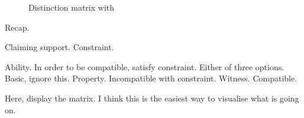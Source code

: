 \begin{note}
  \begin{figure}[H]
    \centering
    \saMtxInterpreted{}
    \caption{Distinction matrix with }
    \label{fig:saMtxInterpreted:outline}
  \end{figure}
\end{note}

\begin{note}
  Recap.

  Claiming support.
  Constraint.

  Ability.
  In order to be compatible, satisfy constraint.
  Either of three options.
  Basic, ignore this.
  Property. Incompatible with constraint.
  Witness. Compatible.

  Here, display the matrix.
  I think this is the easiest way to visualise what is going on.
\end{note}


